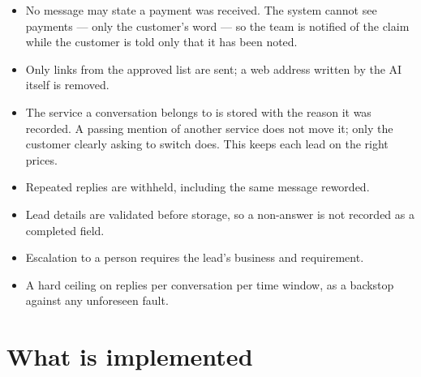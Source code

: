 \documentclass[10pt,a4paper]{article}
\begin{document}
\begin{itemize}
\item No message may state a payment was received. The system cannot see
payments --- only the customer's word --- so the team is notified of the claim
while the customer is told only that it has been noted.
\item Only links from the approved list are sent; a web address written by the
AI itself is removed.
\item The service a conversation belongs to is stored with the reason it was
recorded. A passing mention of another service does not move it; only the
customer clearly asking to switch does. This keeps each lead on the right prices.
\item Repeated replies are withheld, including the same message reworded.
\item Lead details are validated before storage, so a non-answer is not
recorded as a completed field.
\item Escalation to a person requires the lead's business and requirement.
\item A hard ceiling on replies per conversation per time window, as a backstop
against any unforeseen fault.
\end{itemize}

\section{What is implemented}
\end{document}

